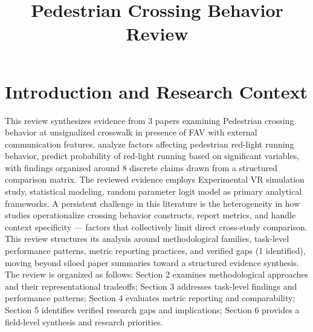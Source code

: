 \documentclass{article}
\title{Pedestrian Crossing Behavior Review}
\begin{document}
\maketitle
\section{Introduction and Research Context}
This review synthesizes evidence from 3 papers examining Pedestrian crossing behavior at unsignalized crosswalk in presence of FAV with external communication features, analyze factors affecting pedestrian red-light running behavior, predict probability of red-light running based on significant variables, with findings organized around 8 discrete claims drawn from a structured comparison matrix. The reviewed evidence employs Experimental VR simulation study, statistical modeling, random parameter logit model as primary analytical frameworks. A persistent challenge in this literature is the heterogeneity in how studies operationalize crossing behavior constructs, report metrics, and handle context specificity — factors that collectively limit direct cross-study comparison. This review structures its analysis around methodological families, task-level performance patterns, metric reporting practices, and verified gaps (1 identified), moving beyond siloed paper summaries toward a structured evidence synthesis. The review is organized as follows: Section 2 examines methodological approaches and their representational tradeoffs; Section 3 addresses task-level findings and performance patterns; Section 4 evaluates metric reporting and comparability; Section 5 identifies verified research gaps and implications; Section 6 provides a field-level synthesis and research priorities.
\end{document}
